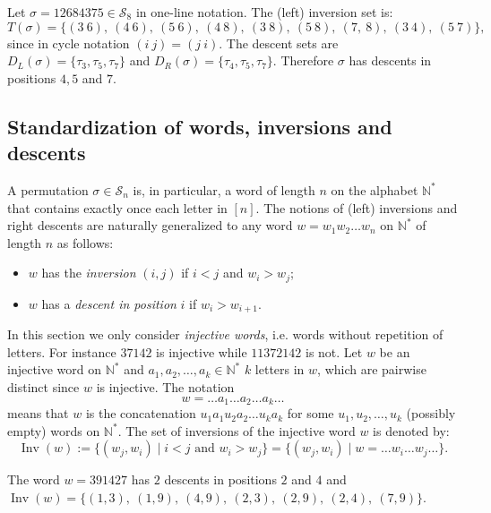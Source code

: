 \documentclass[Unicode]{cedram-alco}
\theoremstyle{definition}
\newcommand{\Sym}[1]{\mathcal{S}_{#1}}
\newcommand{\Symn}{\Sym{n}}
\newcommand{\NN}{\mathbb{N}}
\DeclareMathOperator{\invs}{Inv}
\begin{document}
\begin{ex}\label{ex:Sn1} Let $\sigma = 12684375\in\mathcal S_8$ in one-line notation. The (left) inversion set is:
$$
T(\sigma)=\{(3\ 6),\ (4\ 6),\ (5\ 6),\ (4\ 8),\ (3\ 8),\ (5\ 8),\  (7,\ 8),\ (3\ 4),\ (5\ 7)\},
$$ 
since in cycle notation $(i\ j)=(j\ i)$. 
The descent sets are $D_L(\sigma)=\{\tau_3,\tau_5,\tau_7\}$ and $D_R(\sigma)=\{\tau_4, \tau_5,\tau_7\}$. Therefore $\sigma$ has descents in positions $4,5$ and $7$.
\end{ex}

\subsection{Standardization of words, inversions and descents}\label{ss:TypeA-inversions}  A permutation $\sigma\in \Symn$ is, in particular, a word of length $n$ on the alphabet $\NN^*$ that contains exactly once each letter in $[n]$.  The notions of (left) inversions and right descents are naturally generalized to any word $w=w_1w_2\dots w_n$ on $\NN^*$ of length $n$ as follows:
\begin{itemize}
\item  $w$ has the {\em inversion} $(i,j)$ if $i < j$ and $w_i > w_j$;
\item $w$ has a  \emph{descent in position} $i$ if $w_i > w_{i+1}$. 
\end{itemize}

In this section we only consider {\em injective words}, i.e. words without repetition of letters. For instance $37142$ is injective while $11372142$ is not. Let $w$ be an injective word on $\NN^*$ and $a_1, a_2,\dots,a_k \in\NN^*$ $k$ letters in $w$, which are pairwise distinct since $w$ is injective. The notation
$$
w=\dots a_1\dots a_2\dots a_k\dots
$$
means that $w$ is the concatenation $u_1 a_1u_2 a_2\dots u_k a_k$ for some $u_1,u_2,\dots,u_k$ (possibly empty) words on $\NN^*$.  The set of inversions of the injective word $w$ is denoted by:
\begin{equation}\label{eq:Invs}
\invs(w) := \lbrace (w_j, w_i) \mid i < j \text{ and } w_i > w_j \rbrace= \lbrace (w_j, w_i) \mid w=\dots w_i \dots w_j \dots \rbrace.
\end{equation}


\begin{ex}\label{ex:Words1}  The word $w = 391427$ has $2$ descents in positions $2$ and $4$ and $\invs(w)=\{(1,3),\ (1,9), \ (4,9),\  (2,3),\ (2,9),\ (2,4),\ (7,9)\}$.
\end{ex}
\end{document}
